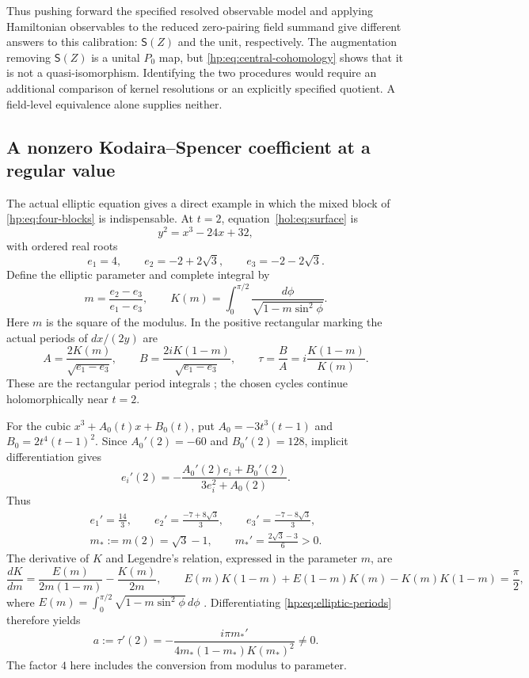 Thus pushing forward the specified resolved observable model and
applying Hamiltonian observables to the reduced zero-pairing
field summand give different answers to this calibration:
$\mathsf S(Z)$ and the unit, respectively. The augmentation
removing $\mathsf S(Z)$ is a unital $P_0$ map, but
\eqref{hp:eq:central-cohomology} shows that it is not a
quasi-isomorphism. Identifying the two procedures would require
an additional comparison of kernel resolutions or an explicitly
specified quotient. A field-level equivalence alone supplies
neither.

\subsection{A nonzero Kodaira--Spencer coefficient at a regular value}
\label{hp:subsec:variation}

The actual elliptic equation gives a direct example in which the
mixed block of \eqref{hp:eq:four-blocks} is indispensable. At
$t=2$, equation~\eqref{hol:eq:surface} is
\[
 y^2=x^3-24x+32,
\]
with ordered real roots
\[
 e_1=4,\qquad e_2=-2+2\sqrt3,\qquad e_3=-2-2\sqrt3.
\]
Define the elliptic parameter and complete integral by
\begin{equation}\label{hp:eq:elliptic-parameter}
 m=\frac{e_2-e_3}{e_1-e_3},\qquad
 K(m)=\int_0^{\pi/2}\frac{d\phi}{\sqrt{1-m\sin^2\phi}}.
\end{equation}
Here $m$ is the square of the modulus. In the positive rectangular
marking the actual periods of $dx/(2y)$ are
\begin{equation}\label{hp:eq:elliptic-periods}
 A=\frac{2K(m)}{\sqrt{e_1-e_3}},\qquad
 B=\frac{2iK(1-m)}{\sqrt{e_1-e_3}},\qquad
 \tau=\frac BA=i\frac{K(1-m)}{K(m)}.
\end{equation}
These are the rectangular period integrals
\cite[\S23.6(iv)]{DLMFElliptic}; the chosen cycles continue
holomorphically near $t=2$.

For the cubic $x^3+A_0(t)x+B_0(t)$, put
$A_0=-3t^3(t-1)$ and $B_0=2t^4(t-1)^2$.
Since $A_0'(2)=-60$ and $B_0'(2)=128$, implicit differentiation
gives
\[
 e_i'(2)=-\frac{A_0'(2)e_i+B_0'(2)}{3e_i^2+A_0(2)}.
\]
Thus
\begin{equation}\label{hp:eq:root-jets}
\begin{gathered}
 e_1'=\frac{14}{3},\qquad
 e_2'=\frac{-7+8\sqrt3}{3},\qquad
 e_3'=\frac{-7-8\sqrt3}{3},\\
 m_*:=m(2)=\sqrt3-1,\qquad
 m_*'=\frac{2\sqrt3-3}{6}>0.
\end{gathered}
\end{equation}
The derivative of $K$ and Legendre's relation, expressed in the
parameter $m$, are
\[
 \frac{dK}{dm}=\frac{E(m)}{2m(1-m)}-\frac{K(m)}{2m},
 \qquad
 E(m)K(1-m)+E(1-m)K(m)-K(m)K(1-m)=\frac\pi2,
\]
where $E(m)=\int_0^{\pi/2}\sqrt{1-m\sin^2\phi}\,d\phi$
\cite[\S\S19.4,19.7]{DLMFElliptic}. Differentiating
\eqref{hp:eq:elliptic-periods} therefore yields
\begin{equation}\label{hp:eq:tau-derivative}
 a:=\tau'(2)
 =-\frac{i\pi m_*'}{4m_*(1-m_*)K(m_*)^2}\ne0.
\end{equation}
The factor $4$ here includes the conversion from modulus to
parameter.

